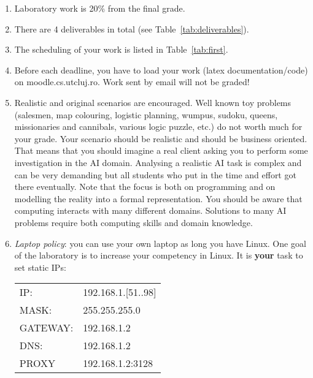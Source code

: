 \begin{enumerate}
 \item Laboratory work is 20\% from the final grade. 
 \item There are 4 deliverables in total (see Table~\ref{tab:deliverables}).
\item The scheduling of your work is listed in Table~\ref{tab:first}.
\item Before each deadline, you have to load your work (latex documentation/code) on moodle.cs.utcluj.ro. Work sent by email will not be graded!




\item Realistic and original scenarios are encouraged. 
Well known toy problems (salesmen, map colouring, logistic planning, wumpus, sudoku, queens, missionaries and cannibals, various logic puzzle, etc.) do not worth much for your grade. 
Your scenario should be realistic and should be business oriented. 
That means that you should imagine a real client asking you to perform some investigation in the AI domain.
Analysing a realistic AI task is complex and can be very
demanding but all students who put in the time and effort got there eventually.
Note that the focus is both on programming and on modelling the reality into a formal representation.
You should be aware that computing interacts with many different domains. 
Solutions to many AI problems require both computing skills and domain knowledge.


\item {\it Laptop policy}: you can use your own laptop as long you have Linux. One goal of the laboratory is to increase your competency in Linux. It is \textbf{your} task to set static IPs:
\begin{center}
\begin{tabular}{ll}
IP: & 192.168.1.[51..98] \\%
MASK:&  255.255.255.0\\
GATEWAY:&  192.168.1.2\\
DNS:& 192.168.1.2\\
PROXY & 192.168.1.2:3128\\
\end{tabular}


\end{center}
\end{enumerate}

